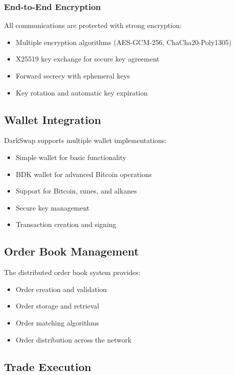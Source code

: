 \documentclass[11pt,a4paper]{article}
\begin{document}
\subsubsection{End-to-End Encryption}

All communications are protected with strong encryption:

\begin{itemize}
    \item Multiple encryption algorithms (AES-GCM-256, ChaCha20-Poly1305)
    \item X25519 key exchange for secure key agreement
    \item Forward secrecy with ephemeral keys
    \item Key rotation and automatic key expiration
\end{itemize}

\subsection{Wallet Integration}

DarkSwap supports multiple wallet implementations:

\begin{itemize}
    \item Simple wallet for basic functionality
    \item BDK wallet for advanced Bitcoin operations
    \item Support for Bitcoin, runes, and alkanes
    \item Secure key management
    \item Transaction creation and signing
\end{itemize}

\subsection{Order Book Management}

The distributed order book system provides:

\begin{itemize}
    \item Order creation and validation
    \item Order storage and retrieval
    \item Order matching algorithms
    \item Order distribution across the network
\end{itemize}

\subsection{Trade Execution}
\end{document}
